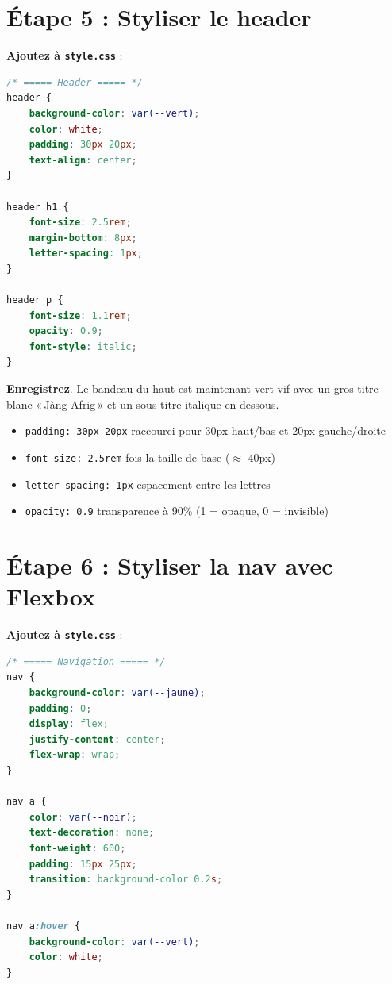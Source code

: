 \documentclass[11pt,a4paper]{article}
\newcommand{\cmark}{\ding{51}}
\begin{document}
\newpage

\section{Étape 5 : Styliser le header}

\textbf{Ajoutez à \texttt{style.css}} :

\begin{lstlisting}[language=CSS]
/* ===== Header ===== */
header {
    background-color: var(--vert);
    color: white;
    padding: 30px 20px;
    text-align: center;
}

header h1 {
    font-size: 2.5rem;
    margin-bottom: 8px;
    letter-spacing: 1px;
}

header p {
    font-size: 1.1rem;
    opacity: 0.9;
    font-style: italic;
}
\end{lstlisting}

\textbf{Enregistrez}. Le bandeau du haut est maintenant vert vif avec un
gros titre blanc «\,Jàng Afrig\,» et un sous-titre italique en dessous. \cmark

\begin{infobox}
\begin{itemize}[leftmargin=*,nosep]
    \item \texttt{padding: 30px 20px} \quad raccourci pour 30px haut/bas et 20px gauche/droite
    \item \texttt{font-size: 2.5rem}  fois la taille de base ($\approx$ 40px)
    \item \texttt{letter-spacing: 1px} \quad espacement entre les lettres
    \item \texttt{opacity: 0.9} \quad transparence à 90\% (1 = opaque, 0 = invisible)
\end{itemize}
\end{infobox}

\section{Étape 6 : Styliser la nav avec Flexbox}

\textbf{Ajoutez à \texttt{style.css}} :

\begin{lstlisting}[language=CSS]
/* ===== Navigation ===== */
nav {
    background-color: var(--jaune);
    padding: 0;
    display: flex;
    justify-content: center;
    flex-wrap: wrap;
}

nav a {
    color: var(--noir);
    text-decoration: none;
    font-weight: 600;
    padding: 15px 25px;
    transition: background-color 0.2s;
}

nav a:hover {
    background-color: var(--vert);
    color: white;
}
\end{lstlisting}
\end{document}
